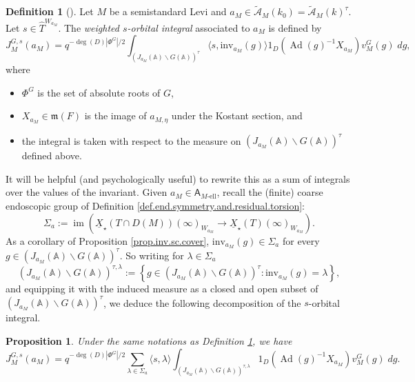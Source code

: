 \documentclass[openany]{amsbook}
\newtheorem{proposition}[theorem]{Proposition}
\theoremstyle{definition}
\newtheorem{definition}[theorem]{Definition}
\theoremstyle{remark}
\numberwithin{equation}{section}
\newcommand{\cA}{\mathcal{A}}
\newcommand{\A}{\mathbb{A}}
\newcommand{\im}{\operatorname{im}}
\newcommand{\ul}[1]{\underline{#1}}
\renewcommand{\-}{\operatorname{-}}
\newcommand{\on}[1]{\operatorname{#1}}
\renewcommand{\A}{\mathbb{A}}
\newcommand{\fm}{\mathfrak{m}}
\newcommand{\el}{\text{-ell}}
\newcommand{\ctA}{\widetilde{\cA}}
\newcommand{\bA}{\mathsf{A}}
\newcommand{\bAe}[1]{\bA_{#1\el}}
\renewcommand{\fm}{\mathfrak{m}}
\newcommand{\Ad}{\on{Ad}}
\newcommand{\inv}{\mathrm{inv}}
\begin{document}
\begin{definition}[{\cite[D\'efinition 11.7.1]{CLII}}]\label{def.s.orbital.integral.adelic}
    Let $M$ be a semistandard Levi and $a_M \in \ctA_M(k_0) = \ctA_M(k)^\tau$. Let $s \in \widehat{T}^{W_{a_M}}$. The \emph{weighted $s$-orbital integral} associated to $a_M$ is defined by
    $$
        J_M^{G,s}(a_M) = q^{-\deg(D)|\Phi^G|/2} \int_{(J_{a_M}(\A) \backslash G(\A))^{\tau}} \langle s, \inv_{a_M}(g)\rangle 1_D(\Ad(g)^{-1} X_{a_M}) v_M^G(g) \; dg,
    $$
    where \begin{itemize} 
    \item $\Phi^G$ is the set of absolute roots of $G$, 
    \item $X_{a_M} \in \fm(F)$ is the image of $a_{M, \eta}$ under the Kostant section, and
    \item the integral is taken with respect to the measure on $(J_{a_M}(\A) \backslash G(\A))^{\tau}$ defined above.
    \end{itemize}
\end{definition}

It will be helpful (and psychologically useful) to rewrite this as a sum of integrals over the values of the invariant. Given $a_M \in \bAe{M}$, recall the (finite) coarse endoscopic group of Definition \ref{def.end.symmetry.and.residual.torsion}:
$$
    \Sigma_a := \im(\ul{X}_{\star}(T \cap D(M))(\infty)_{W_{a_M}} \to \ul{X}_{\star}(T)(\infty)_{W_{a_M}}). 
$$
As a corollary of Proposition \ref{prop.inv.sc.cover}, $\inv_{a_M}(g) \in \Sigma_a$ for every $g \in (J_{a_M}(\A) \backslash G(\A))^{\tau}$. So writing for $\lambda \in \Sigma_a$
\begin{equation}\label{eqn.sigma.cpt.adelic.pts}
    (J_{a_M}(\A) \backslash G(\A))^{\tau, \lambda} := \left\{g \in (J_{a_M}(\A) \backslash G(\A))^{\tau} : \inv_{a_M}(g) = \lambda\right\},
\end{equation}
and equipping it with the induced measure as a closed and open subset of $(J_{a_M}(\A) \backslash G(\A))^{\tau}$, we deduce the following decomposition of the $s$-orbital integral.

\begin{proposition}\label{prop.s.orbital.int.decomp}
    Under the same notations as Definition \ref{def.s.orbital.integral.adelic}, we have
    $$
        J_M^{G,s}(a_M) = q^{-\deg(D)|\Phi^G|/2} \sum_{\lambda \in \Sigma_a} \langle s, \lambda \rangle \int_{ (J_{a_M}(\A) \backslash G(\A))^{\tau,\lambda}} 1_D(\Ad(g)^{-1} X_{a_M}) v_M^G(g) \; dg.
    $$
\end{proposition}
\end{document}
